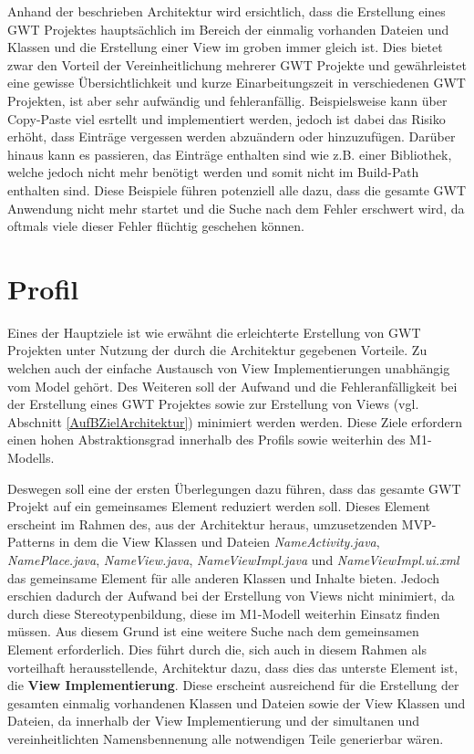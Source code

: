 Anhand der beschrieben Architektur wird ersichtlich, dass die Erstellung eines
GWT Projektes hauptsächlich im Bereich der einmalig vorhanden Dateien und
Klassen und die Erstellung einer View im groben immer gleich ist. Dies bietet
zwar den Vorteil der Vereinheitlichung mehrerer GWT Projekte und gewährleistet
eine gewisse Übersichtlichkeit und kurze Einarbeitungszeit in verschiedenen GWT
Projekten, ist aber sehr aufwändig und fehleranfällig. Beispielsweise kann über
\grqq{}Copy-Paste\grqq{} viel esrtellt und implementiert werden, jedoch ist
dabei das Risiko erhöht, dass Einträge vergessen werden abzuändern oder
hinzuzufügen. Darüber hinaus kann es passieren, das Einträge enthalten sind wie
z.B. einer Bibliothek, welche jedoch nicht mehr benötigt werden und somit nicht
im Build-Path enthalten sind.
Diese Beispiele führen potenziell alle dazu, dass die gesamte GWT Anwendung nicht mehr startet
und die Suche nach dem Fehler erschwert wird, da oftmals viele dieser
Fehler flüchtig geschehen können. 
\section{Profil}\label{AufBProfil}
Eines der Hauptziele ist wie erwähnt die erleichterte Erstellung von GWT
Projekten unter Nutzung der durch die Architektur gegebenen Vorteile. Zu welchen
auch der einfache Austausch von View Implementierungen unabhängig vom Model
gehört. Des Weiteren soll der Aufwand und die Fehleranfälligkeit bei der
Erstellung eines GWT Projektes sowie zur Erstellung von Views (vgl.
Abschnitt \ref{AufBZielArchitektur}) minimiert werden werden. Diese Ziele
erfordern einen hohen Abstraktionsgrad innerhalb des Profils sowie weiterhin des
M1-Modells.

Deswegen soll eine der ersten Überlegungen dazu führen, dass das
gesamte GWT Projekt auf ein gemeinsames Element reduziert werden soll. Dieses
Element erscheint im Rahmen des, aus der Architektur heraus, umzusetzenden
MVP-Patterns in dem die View Klassen und Dateien
\textit{\grqq{}Name\grqq{}Activity.java}, \textit{\grqq{}Name\grqq{}Place.java},
\textit{\grqq{}Name\grqq{}View.java}, \textit{\grqq{}Name\grqq{}ViewImpl.java}
und \textit{\grqq{}Name\grqq{}ViewImpl.ui.xml} das gemeinsame Element für alle
anderen Klassen und Inhalte bieten. Jedoch erschien dadurch der Aufwand bei der
Erstellung von Views nicht minimiert, da durch diese Stereotypenbildung, diese
im M1-Modell weiterhin Einsatz finden müssen. Aus diesem Grund ist eine weitere
Suche nach dem gemeinsamen Element erforderlich. Dies führt durch die, sich auch
in diesem Rahmen als vorteilhaft herausstellende, Architektur dazu, dass dies
das unterste Element ist, die \textbf{View Implementierung}.  Diese erscheint
ausreichend für die Erstellung der gesamten einmalig vorhandenen Klassen und
Dateien sowie der View Klassen und Dateien, da innerhalb der View
Implementierung und der simultanen und vereinheitlichten Namensbennenung alle
notwendigen Teile generierbar wären. 

